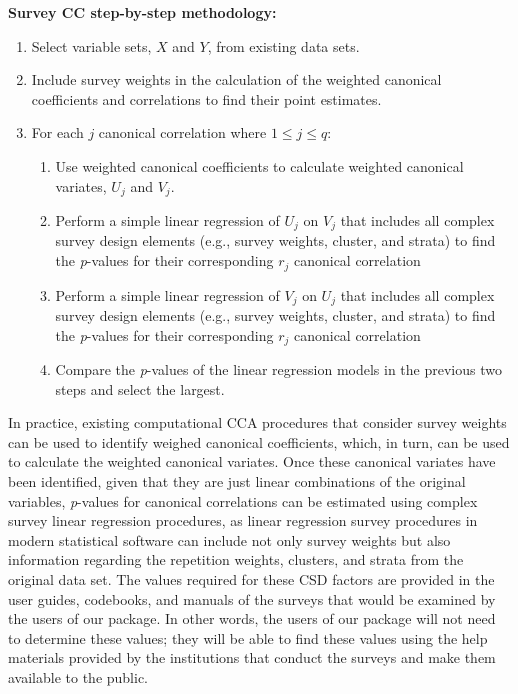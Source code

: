 \textbf{Survey CC step-by-step methodology:}

\begin{enumerate}
\def\labelenumi{\arabic{enumi}.}
\tightlist
\item
  Select variable sets, \(X\) and \(Y\), from existing data sets.
\item
  Include survey weights in the calculation of the weighted canonical coefficients and correlations to find their point estimates.
\item
  For each \(j\) canonical correlation where \(1\leq j\leq q\):

  \begin{enumerate}
  \def\labelenumii{(\alph{enumii})}
  \tightlist
  \item
    Use weighted canonical coefficients to calculate weighted canonical variates, \(U_j\) and \(V_j\).
  \item
    Perform a simple linear regression of \(U_j\) on \(V_j\) that includes all complex survey design elements (e.g., survey weights, cluster, and strata) to find the \emph{p}-values for their corresponding \(r_j\) canonical correlation
  \item
    Perform a simple linear regression of \(V_j\) on \(U_j\) that includes all complex survey design elements (e.g., survey weights, cluster, and strata) to find the \emph{p}-values for their corresponding \(r_j\) canonical correlation
  \item
    Compare the \emph{p}-values of the linear regression models in the previous two steps and select the largest.
  \end{enumerate}
\end{enumerate}

In practice, existing computational CCA procedures that consider survey weights can be used to identify weighed canonical coefficients, which, in turn, can be used to calculate the weighted canonical variates. Once these canonical variates have been identified, given that they are just linear combinations of the original variables, \emph{p}-values for canonical correlations can be estimated using complex survey linear regression procedures, as linear regression survey procedures in modern statistical software can include not only survey weights but also information regarding the repetition weights, clusters, and strata from the original data set. The values required for these CSD factors are provided in the user guides, codebooks, and manuals of the surveys that would be examined by the users of our package. In other words, the users of our package will not need to determine these values; they will be able to find these values using the help materials provided by the institutions that conduct the surveys and make them available to the public.

